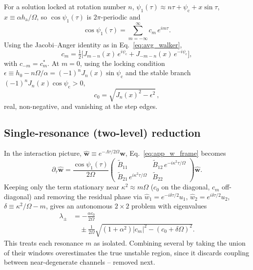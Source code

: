 For a solution locked at rotation number $n$, $\psi_1(\tau)\approx n\tau+\psi_\text{c}+x\sin\tau$, $x\equiv\alpha h_\text{a}/\Omega$, so $\cos\psi_1(\tau)$ is $2\pi$-periodic and
%
\begin{equation}
    \cos\psi_1(\tau) = \sum_{m=-\infty}^{\infty} c_m\, e^{im\tau}.
    \label{eq:app_cos_fourier}
\end{equation}
%
Using the Jacobi--Anger identity as in Eq.~\eqref{eq:avg_walker},
%
\begin{equation}
    c_m = \tfrac12\Big[J_{m-n}(x)\,e^{i\psi_\text{c}} + J_{-m-n}(x)\,e^{-i\psi_\text{c}}\Big],
    \label{eq:app_cm}
\end{equation}
%
with $c_{-m}=c_m^{*}$. At $m=0$, using the locking condition $\epsilon \equiv h_0-n\Omega/\alpha=(-1)^nJ_n(x)\sin\psi_\text{c}$ and the stable branch $(-1)^nJ_n(x)\cos\psi_\text{c}>0$,
%
\begin{equation}
    c_0 = \sqrt{J_n(x)^2-\epsilon^2}\,,
    \label{eq:app_c0}
\end{equation}
%
real, non-negative, and vanishing at the step edges.

\subsection{Single-resonance (two-level) reduction}
\label{app:two_level}

In the interaction picture, $\hat{\mathbf{w}}\equiv e^{-\Lambda\tau/2\Omega}\mathbf{w}$, Eq.~\eqref{eq:app_w_frame} becomes
%
\begin{equation}
    \partial_\tau\hat{\mathbf{w}} = \frac{\cos\psi_1(\tau)}{2\Omega}
    \begin{pmatrix}
    \tilde B_{11} & \tilde B_{12}\,e^{-i\kappa^2\tau/\Omega}\\
    \tilde B_{21}\,e^{i\kappa^2\tau/\Omega} & \tilde B_{22}
    \end{pmatrix}\hat{\mathbf{w}}.
    \label{eq:app_interaction_picture}
\end{equation}
%
Keeping only the term stationary near $\kappa^2\approx m\Omega$ ($c_0$ on the diagonal, $c_m$ off-diagonal) and removing the residual phase via $\hat w_1=e^{-i\delta\tau/2}u_1$, $\hat w_2=e^{i\delta\tau/2}u_2$, $\delta\equiv\kappa^2/\Omega-m$, gives an autonomous $2\times2$ problem with eigenvalues
%
\begin{align}
    \lambda_\pm &= -\frac{\alpha c_0}{2\Omega} \nonumber\\
    &\quad\pm \frac{1}{2\Omega}\sqrt{(1+\alpha^2)|c_m|^2-(c_0+\delta\Omega)^2}.
    \label{eq:app_two_level_eigs}
\end{align}
%
This treats each resonance $m$ as isolated. Combining several by taking the union of their windows overestimates the true unstable region, since it discards coupling between near-degenerate channels -- removed next.

